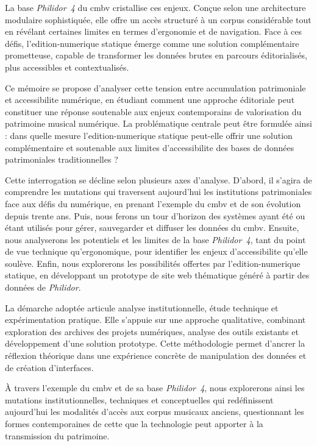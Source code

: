 La base \textit{Philidor~4} du \gls{cmbv} cristallise ces enjeux. Conçue selon une architecture modulaire sophistiquée, elle offre un accès structuré à un corpus considérable tout en révélant certaines limites en termes d'ergonomie et de navigation. Face à ces défis, l'\gls{edition-numerique} statique émerge comme une solution complémentaire prometteuse, capable de transformer les données brutes en parcours éditorialisés, plus accessibles et contextualisés.

Ce mémoire se propose d'analyser cette tension entre accumulation patrimoniale et \gls{accessibilite} numérique, en étudiant comment une approche éditoriale peut constituer une réponse soutenable aux enjeux contemporains de valorisation du patrimoine musical numérique. La problématique centrale peut être formulée ainsi : dans quelle mesure l'\gls{edition-numerique} statique peut-elle offrir une solution complémentaire et soutenable aux limites d'\gls{accessibilite} des bases de données patrimoniales traditionnelles ?

Cette interrogation se décline selon plusieurs axes d'analyse. D'abord, il s'agira de comprendre les mutations qui traversent aujourd'hui les institutions patrimoniales face aux défis du numérique, en prenant l'exemple du \gls{cmbv} et de son évolution depuis trente ans. Puis, nous ferons un tour d'horizon des systèmes ayant été ou étant utilisés pour gérer, sauvegarder et diffuser les données du \gls{cmbv}. Ensuite, nous analyserons les potentiels et les limites de la base \textit{Philidor~4}, tant du point de vue technique qu'ergonomique, pour identifier les enjeux d'\gls{accessibilite} qu'elle soulève. Enfin, nous explorerons les possibilités offertes par l'\gls{edition-numerique} statique, en développant un prototype de site web thématique généré à partir des données de \textit{Philidor}.

La démarche adoptée articule analyse institutionnelle, étude technique et expérimentation pratique. Elle s'appuie sur une approche qualitative, combinant exploration des archives des projets numériques, analyse des outils existants et développement d'une solution prototype. Cette méthodologie permet d'ancrer la réflexion théorique dans une expérience concrète de manipulation des données et de création d'interfaces.

À travers l'exemple du \gls{cmbv} et de sa base \textit{Philidor~4}, nous explorerons ainsi les mutations institutionnelles, techniques et conceptuelles qui redéfinissent aujourd'hui les modalités d'accès aux corpus musicaux anciens, questionnant les formes contemporaines de cette  que la technologie peut apporter à la transmission du patrimoine.